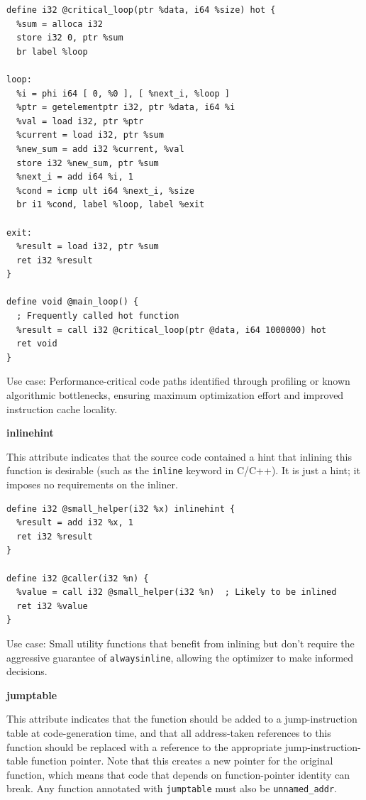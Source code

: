 \begin{lstlisting}[style=ir]
define i32 @critical_loop(ptr %data, i64 %size) hot {
  %sum = alloca i32
  store i32 0, ptr %sum
  br label %loop

loop:
  %i = phi i64 [ 0, %0 ], [ %next_i, %loop ]
  %ptr = getelementptr i32, ptr %data, i64 %i
  %val = load i32, ptr %ptr
  %current = load i32, ptr %sum
  %new_sum = add i32 %current, %val
  store i32 %new_sum, ptr %sum
  %next_i = add i64 %i, 1
  %cond = icmp ult i64 %next_i, %size
  br i1 %cond, label %loop, label %exit

exit:
  %result = load i32, ptr %sum
  ret i32 %result
}

define void @main_loop() {
  ; Frequently called hot function
  %result = call i32 @critical_loop(ptr @data, i64 1000000) hot
  ret void
}
\end{lstlisting}

Use case: Performance-critical code paths identified through profiling or known algorithmic bottlenecks, ensuring maximum optimization effort and improved instruction cache locality.

\textbf{inlinehint}

This attribute indicates that the source code contained a hint that inlining this function is desirable (such as the \texttt{inline} keyword in C/C++).
It is just a hint; it imposes no requirements on the inliner.

\begin{lstlisting}[style=ir]
define i32 @small_helper(i32 %x) inlinehint {
  %result = add i32 %x, 1
  ret i32 %result
}

define i32 @caller(i32 %n) {
  %value = call i32 @small_helper(i32 %n)  ; Likely to be inlined
  ret i32 %value
}
\end{lstlisting}

Use case: Small utility functions that benefit from inlining but don't require the aggressive guarantee of \texttt{alwaysinline}, allowing the optimizer to make informed decisions.

\textbf{jumptable}

This attribute indicates that the function should be added to a jump-instruction table at code-generation time, and that all address-taken references to this function should be replaced with a reference to the appropriate jump-instruction-table function pointer.
Note that this creates a new pointer for the original function, which means that code that depends on function-pointer identity can break.
Any function annotated with \texttt{jumptable} must also be \texttt{unnamed\_addr}.

